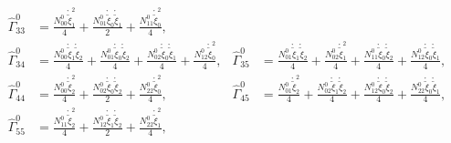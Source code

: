 \begin{equation}
\begin{aligned}
\widehat{\Gamma}^{0}_{33} &= \frac{N^{0}_{00} \mathring{{\widetilde{{\xi}}}}_{1}^{2}}{4} + \frac{N^{0}_{01} \mathring{{\widetilde{{\xi}}}}_{0} \mathring{{\widetilde{{\xi}}}}_{1}}{2} + \frac{N^{0}_{11} \mathring{{\widetilde{{\xi}}}}_{0}^{2}}{4},\\[1ex]
\widehat{\Gamma}^{0}_{34} &= \frac{N^{0}_{00} \mathring{{\widetilde{{\xi}}}}_{1} \mathring{{\widetilde{{\xi}}}}_{2}}{4} + \frac{N^{0}_{01} \mathring{{\widetilde{{\xi}}}}_{0} \mathring{{\widetilde{{\xi}}}}_{2}}{4} + \frac{N^{0}_{02} \mathring{{\widetilde{{\xi}}}}_{0} \mathring{{\widetilde{{\xi}}}}_{1}}{4} + \frac{N^{0}_{12} \mathring{{\widetilde{{\xi}}}}_{0}^{2}}{4}, & 
\widehat{\Gamma}^{0}_{35} &= \frac{N^{0}_{01} \mathring{{\widetilde{{\xi}}}}_{1} \mathring{{\widetilde{{\xi}}}}_{2}}{4} + \frac{N^{0}_{02} \mathring{{\widetilde{{\xi}}}}_{1}^{2}}{4} + \frac{N^{0}_{11} \mathring{{\widetilde{{\xi}}}}_{0} \mathring{{\widetilde{{\xi}}}}_{2}}{4} + \frac{N^{0}_{12} \mathring{{\widetilde{{\xi}}}}_{0} \mathring{{\widetilde{{\xi}}}}_{1}}{4},\\[1ex]
\widehat{\Gamma}^{0}_{44} &= \frac{N^{0}_{00} \mathring{{\widetilde{{\xi}}}}_{2}^{2}}{4} + \frac{N^{0}_{02} \mathring{{\widetilde{{\xi}}}}_{0} \mathring{{\widetilde{{\xi}}}}_{2}}{2} + \frac{N^{0}_{22} \mathring{{\widetilde{{\xi}}}}_{0}^{2}}{4}, & 
\widehat{\Gamma}^{0}_{45} &= \frac{N^{0}_{01} \mathring{{\widetilde{{\xi}}}}_{2}^{2}}{4} + \frac{N^{0}_{02} \mathring{{\widetilde{{\xi}}}}_{1} \mathring{{\widetilde{{\xi}}}}_{2}}{4} + \frac{N^{0}_{12} \mathring{{\widetilde{{\xi}}}}_{0} \mathring{{\widetilde{{\xi}}}}_{2}}{4} + \frac{N^{0}_{22} \mathring{{\widetilde{{\xi}}}}_{0} \mathring{{\widetilde{{\xi}}}}_{1}}{4},\\[1ex]
\widehat{\Gamma}^{0}_{55} &= \frac{N^{0}_{11} \mathring{{\widetilde{{\xi}}}}_{2}^{2}}{4} + \frac{N^{0}_{12} \mathring{{\widetilde{{\xi}}}}_{1} \mathring{{\widetilde{{\xi}}}}_{2}}{2} + \frac{N^{0}_{22} \mathring{{\widetilde{{\xi}}}}_{1}^{2}}{4}, & 
\end{aligned}\end{equation}

